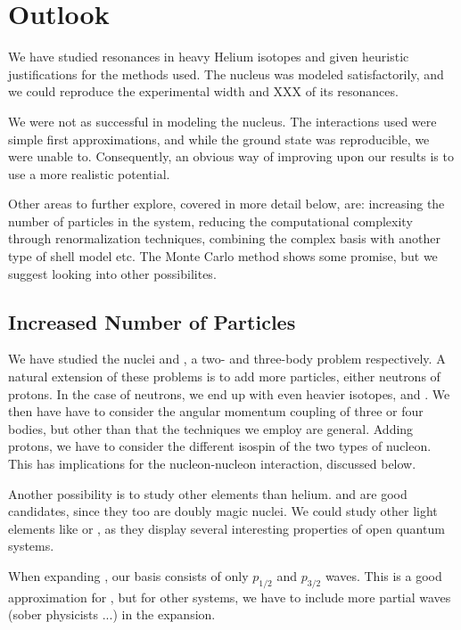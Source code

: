 \documentclass[../main/report.tex]{subfiles}
\begin{document}
\chapter{Outlook}
\label{cha:outlook}

We have studied resonances in heavy Helium isotopes and given heuristic justifications for the methods used. The  nucleus was modeled satisfactorily, and we could reproduce the experimental width and XXX of its resonances. 

We were not as successful in modeling the  nucleus. The interactions used were simple first approximations, and while the ground state was reproducible, we were unable to. Consequently, an obvious way of improving upon our results is to use a more realistic potential. 

Other areas to further explore, covered in more detail below, are: increasing the number of particles in the system, reducing the computational complexity through renormalization techniques, combining the complex basis with another type of shell model etc.
The Monte Carlo method shows some promise, but we suggest looking into other possibilites.

\section{Increased Number of Particles}

We have studied the nuclei  and , a two- and three-body problem respectively. 
A natural extension of these problems is to add more particles, either neutrons of protons.
In the case of neutrons, we end up with even heavier \He{} isotopes,   and .
We then have have to consider the angular momentum coupling of three or four bodies, but other than that the techniques we employ are general.
Adding protons, we have to consider the different isospin of the two types of nucleon.
This has implications for the nucleon-nucleon interaction, discussed below.

Another possibility is to study other elements than helium.  and  are good candidates, since they too are doubly magic nuclei.
We could study other light elements like  or , as they display several interesting properties of open quantum systems.

When expanding , our basis consists of only $p_{1/2}$ and $p_{3/2}$ waves. 
This is a good approximation for  \cite{gamow_shell_model_2008},  but for other systems, we have to include more partial waves (sober physicists ...) in the expansion.
\end{document}
